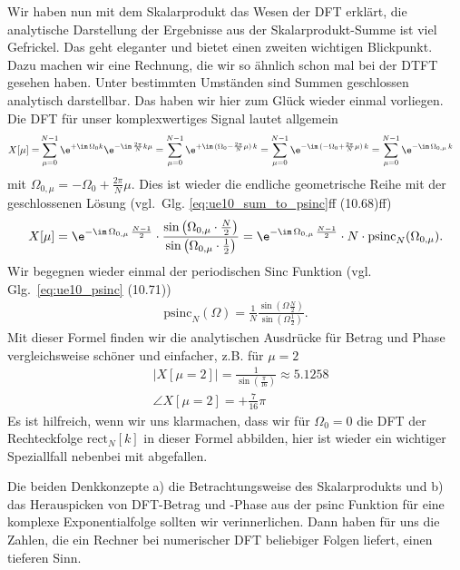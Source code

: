\begin{ExCalc}
Wir haben nun mit dem Skalarprodukt das Wesen der DFT erklärt,
die analytische Darstellung der Ergebnisse aus der Skalarprodukt-Summe
ist viel Gefrickel.
%
Das geht eleganter und bietet einen zweiten wichtigen Blickpunkt. Dazu
machen wir eine Rechnung, die wir so ähnlich schon mal bei der DTFT gesehen haben.
Unter bestimmten Umständen sind Summen geschlossen analytisch darstellbar.
Das haben wir hier zum Glück wieder einmal vorliegen.
Die DFT für unser komplexwertiges Signal lautet allgemein
\begin{align}
X[\mu] =& \sum_{\mu=0}^{N-1} \e^{+\im\,\Omega_0 k} \e^{-\im\,\frac{2\pi}{N} k \mu}
=  \sum_{\mu=0}^{N-1} \e^{+\im\,(\Omega_0 - \frac{2\pi}{N} \mu) \, k}
=  \sum_{\mu=0}^{N-1} \e^{-\im\,(-\Omega_0 + \frac{2\pi}{N} \mu) \, k}
=  \sum_{\mu=0}^{N-1} \e^{-\im\, \Omega_{0,\mu} \,k}
\end{align}
mit $\Omega_{0,\mu} = -\Omega_0 + \frac{2\pi}{N} \mu$.
Dies ist wieder die endliche geometrische Reihe mit der geschlossenen Lösung
(vgl.~Glg. \eqref{eq:ue10_sum_to_psinc}ff (10.68)ff)
\begin{align}
X[\mu] = \e^{-\im \,\Omega_{0,\mu}\,\frac{N-1}{2}} \cdot
\frac{\sin\left(\Omega_{0,\mu}\cdot\frac{N}{2}\right)}{\sin\left(\Omega_{0,\mu}\cdot\frac{1}{2}\right)}
=\e^{-\im \,\Omega_{0,\mu}\,\frac{N-1}{2}} \cdot N \cdot \mathrm{psinc}_N(\Omega_{0,\mu})
.
\end{align}
Wir begegnen wieder einmal der periodischen Sinc Funktion (vgl. Glg.~\eqref{eq:ue10_psinc} (10.71))
\begin{align*}
\mathrm{psinc}_N(\Omega) = \frac{1}{N}\frac{\sin({\Omega\frac{N}{2}})}{\sin({\Omega\frac{1}{2}})}.
\end{align*}
%
Mit dieser Formel finden wir die analytischen Ausdrücke für Betrag und Phase
vergleichsweise schöner und einfacher, z.B. für $\mu=2$
\begin{align}
&|X[\mu=2]| = \frac{1}{\sin(\frac{\pi}{16})} \approx 5.1258\\
&\angle X[\mu=2] = +\frac{7}{16}\pi
\end{align}
Es ist hilfreich, wenn wir uns klarmachen, dass wir für $\Omega_0=0$ die DFT der
Rechteckfolge $\mathrm{rect}_N[k]$
in dieser Formel abbilden, hier ist wieder ein wichtiger Speziallfall
nebenbei mit abgefallen.

Die beiden Denkkonzepte
a) die Betrachtungsweise des
Skalarprodukts
und
b) das Herauspicken von DFT-Betrag und -Phase aus der psinc Funktion
für eine komplexe Exponentialfolge
sollten wir verinnerlichen. Dann haben für uns die Zahlen,
die ein Rechner bei numerischer DFT beliebiger Folgen liefert, einen tieferen
Sinn.


\end{ExCalc}
